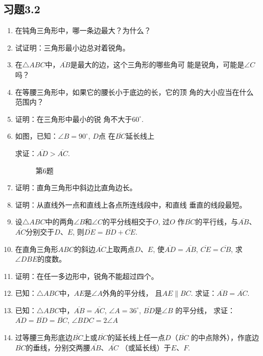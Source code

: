 \subsection*{习题3.2}
\begin{enumerate}
    \item 在钝角三角形中，哪一条边最大？为什么？
    \item 试证明：三角形最小边总对着锐角。
    \item 在$\triangle ABC$中，$\overline{AB}$是最大的边，这个三角形的哪些角可
    能是锐角，可能是$\angle C$吗？

    \item    在等腰三角形中，如果它的腰长小于底边的长，它的顶
    角的大小应当在什么范围内？
    \item 证明：在三角形中最小的锐
    角不大于$60^{\circ}$.
    \item 如图，已知：$\angle B=90^{\circ}$, $D$点
    在$\overline{BC}$延长线上

    求证：$\overline{AD}>\overline{AC}$.

\begin{figure}[htp]
    \centering
{}
    \caption*{第6题}
\end{figure}

    \item 证明：直角三角形中斜边比直角边长。
    \item 证明：从直线外一点和直线上各点所连线段中，和直线
    垂直的线段最短。
    \item 设$\triangle ABC$中的两角$\angle B$和$\angle C$的平分线相交于$O$, 过$O$
    作$\overline{BC}$的平行线，与$\overline{AB}$、$\overline{AC}$分别交于$D$、$E$, 则$\overline{DE}=
    \overline{BD}+\overline{CE}$.
    \item 在直角三角形$ABC$的斜边$\overline{AC}$上取两点$D$、$E$, 使$\overline{AD}=\overline{AB}$, $\overline{CE}=\overline{CB}$, 求$\angle DBE$的度数。
    \item 证明：在任一多边形中，锐角不能超过四个。
    \item 已知：$\triangle ABC$中，$AE$是$\angle A$外角的平分线，
    且$AE\parallel BC$. 
    求证：$\overline{AB}=\overline{AC}$.
    \item 已知：$\triangle ABC$中，$\overline{AB}=\overline{AC}$, $\angle A=36^{\circ}$, $\overline{BD}$是$\angle B$
    的平分线，
    求证：$\overline{AD}=\overline{BD}=\overline{BC}$, $\angle BDC=2\angle A$
    \item 过等腰三角形底边$\overline{BC}$上或$\overline{BC}$的延长线上任一点$D$（$\overline{BC}$
    的中点除外），作底边$\overline{BC}$的垂线，分别交两腰$\overline{AB}$、$\overline{AC}$
    （或延长线）于$E$、$F$. 


\end{enumerate}
